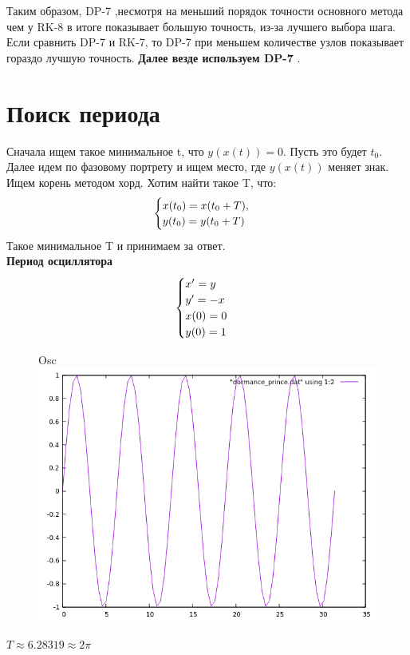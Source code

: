 \documentclass[12pt, a4paper] {article}
\theoremstyle{remark}
\theoremstyle{definition}
\begin{document}
\newpage
Таким образом, DP-7 ,несмотря на меньший порядок точности основного метода чем у RK-8 в итоге показывает большую точность, из-за лучшего выбора шага. Если сравнить DP-7 и RK-7, то DP-7 при меньшем количестве узлов показывает гораздо лучшую точность. \textbf{Далее везде используем DP-7}
.\\

\section{Поиск периода}
Сначала ищем такое минимальное t, что $y(x(t)) = 0$. Пусть это будет $t_0$. Далее идем по фазовому портрету и ищем место, где $y(x(t))$ меняет знак. Ищем корень методом хорд. Хотим найти такое T, что:
\begin{gather}
\begin{cases}
\notag x(t_0) = x(t_0 + T), \\
\notag y(t_0) = y(t_0 + T)
\end{cases}
\end{gather}
Такое минимальное T и принимаем за ответ.
\\
\textbf{Период осциллятора}
\begin{gather}
\begin{cases}
\notag x' = y \\
\notag y' = -x \\
\notag x(0) = 0 \\
\notag y(0) = 1
\end{cases}
\end{gather}
\begin{figure}[h!]
 Osc \\
\centering
\includegraphics[width=0.5\linewidth]{osc2pi} 
\end{figure}
$T \approx 6.28319 \approx 2\pi$\\
\end{document}

